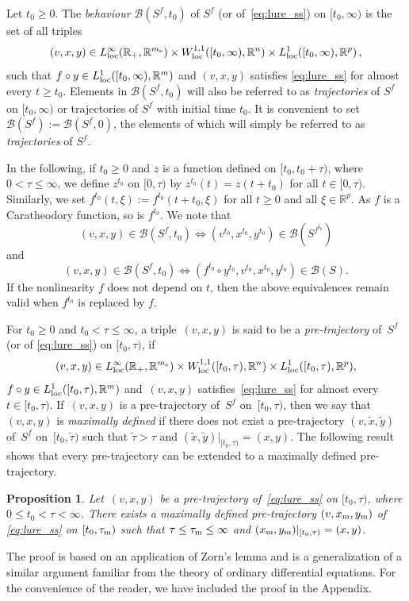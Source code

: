 \documentclass[a4paper,11pt]{article}
\newcommand{\R}{\mathbb R}
\newcommand{\sB}{{\mathcal B}}
\numberwithin{equation}{section}
\numberwithin{figure}{section}
\numberwithin{table}{section}
\newtheorem{proposition}[theorem]{Proposition}
\begin{document}
Let $t_0\geq 0$. The {\it behaviour} $\sB(S^f,t_0)$ of $S^f$ (or of~\eqref{eq:lure_ss}) on
$[t_0,\infty)$ is the set of all triples
\[
(v,x,y)\in L^\infty_{\rm loc}(\R_+,\R^{m_{\rm e}})\times W^{1,1}_{\rm loc}([t_0,\infty),\R^n)\times L^1_{\rm loc}([t_0,\infty),\R^p)\,,
\]
such that $f\circ y\in L^1_{\rm loc}([t_0,\infty),\R^m)$ and $(v,x,y)$ satisfies
\eqref{eq:lure_ss} for almost every $t\geq t_0$. Elements in $\sB(S^f,t_0)$ will also be referred to as {\it trajectories} of $S^f$ on $[t_0,\infty)$ or trajectories of $S^f$ with initial time $t_0$. It is convenient to set  $\sB(S^f):= \sB(S^f,0)$, the elements of which will simply be referred to as {\it trajectories} of $S^f$.

In the following, if $t_0\geq 0$ and $z$ is a function defined on $[t_0,t_0+\tau)$, where $0<\tau\leq\infty$, we define $z^{t_0}$ on $[0,\tau)$ by $z^{t_0}(t)=z(t+t_0)$
for all $t\in[0,\tau)$. Similarly, we set $f^{t_0}(t,\xi):=f^{t_0}(t+t_0,\xi)$ for all $t\geq 0$
and all $\xi\in\R^p$. As $f$ is a Caratheodory function, so is $f^{t_0}$. We note that
\[
(v,x,y)\in\sB(S^f,t_0)\Longleftrightarrow (v^{t_0},x^{t_0},y^{t_0})\in\sB(S^{f^{t_0}})
\]
and
\[
(v,x,y)\in\sB(S^f,t_0)\Longleftrightarrow (f^{t_0}\circ y^{t_0},v^{t_0},x^{t_0},y^{t_0})\in\sB(S).
\]
If the nonlinearity $f$ does not depend on $t$, then the above equivalences remain valid when
$f^{t_0}$ is replaced by $f$.

For $t_0\geq 0$ and $t_0<\tau\leq\infty$, a triple~$(v,x,y)$ is said to be a {\it pre-trajectory} of~$S^f$ (or of \eqref{eq:lure_ss}) on $[t_0,\tau)$, if
\[
(v,x,y)\in L^\infty_{\rm loc}(\R_+,\R^{m_{\rm e}})\times W^{1,1}_{\rm loc}([t_0,\tau),\R^n)\times L^1_{\rm loc}([t_0,\tau),\R^p),
\]
$f\circ y\in L^1_{\rm loc}([t_0,\tau),\R^m)$ and~$(v,x,y)$ satisfies~\eqref{eq:lure_ss} for almost every~$t\in[t_0,\tau)$. If~$(v,x,y)$ is a pre-trajectory of~$S^f$ on~$[t_0,\tau)$, then we say that~$(v,x,y)$ is {\it maximally defined} if there does not exist a pre-trajectory
$(v,\tilde x,\tilde y)$ of~$S^f$ on~$[t_0,\tilde\tau)$ such that $\tilde\tau>\tau$ and
$(\tilde x,\tilde y)|_{[t_0,\tau)}=(x,y)$. The following result shows that every
pre-trajectory can be extended to a maximally defined pre-trajectory.
%
\begin{proposition}\label{pro:max_def}
Let~$(v,x,y)$ be a pre-trajectory of~\eqref{eq:lure_ss} on $[t_0,\tau)$, where
$0\leq t_0<\tau<\infty$. There exists a maximally defined pre-trajectory $(v,x_{\rm m},y_{\rm m})$ of \eqref{eq:lure_ss} on $[t_0,\tau_{\rm m})$ such that $\tau\leq\tau_{\rm m}\leq\infty$ and $(x_{\rm m},y_{\rm m})|_{[t_0,\tau)}=(x,y)$.
\end{proposition}
%
The proof is based on an application of Zorn's lemma and is a generalization of a similar argument familiar from the theory of ordinary differential equations. For the convenience of the reader, we have included the proof in the Appendix.
\end{document}
